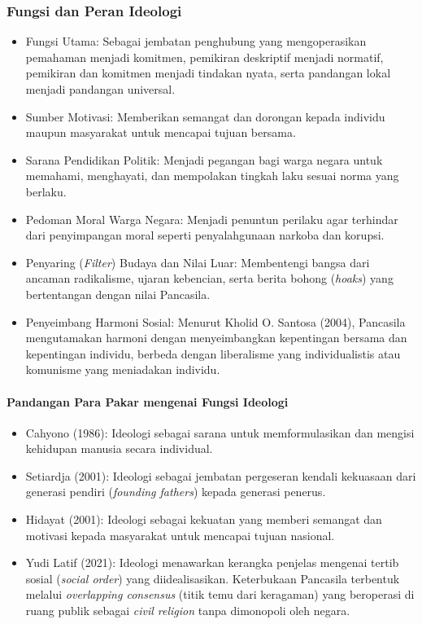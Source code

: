 \subsubsection{Fungsi dan Peran Ideologi}

\begin{itemize}
\item Fungsi Utama: Sebagai jembatan penghubung yang mengoperasikan pemahaman menjadi komitmen, pemikiran deskriptif menjadi normatif, pemikiran dan komitmen menjadi tindakan nyata, serta pandangan lokal menjadi pandangan universal.
\item Sumber Motivasi: Memberikan semangat dan dorongan kepada individu maupun masyarakat untuk mencapai tujuan bersama.
\item Sarana Pendidikan Politik: Menjadi pegangan bagi warga negara untuk memahami, menghayati, dan mempolakan tingkah laku sesuai norma yang berlaku.
\item Pedoman Moral Warga Negara: Menjadi penuntun perilaku agar terhindar dari penyimpangan moral seperti penyalahgunaan narkoba dan korupsi.
\item Penyaring (\textit{Filter}) Budaya dan Nilai Luar: Membentengi bangsa dari ancaman radikalisme, ujaran kebencian, serta berita bohong (\textit{hoaks}) yang bertentangan dengan nilai Pancasila.
\item Penyeimbang Harmoni Sosial: Menurut Kholid O. Santosa (2004), Pancasila mengutamakan harmoni dengan menyeimbangkan kepentingan bersama dan kepentingan individu, berbeda dengan liberalisme yang individualistis atau komunisme yang meniadakan individu.
\end{itemize}

\paragraph{Pandangan Para Pakar mengenai Fungsi Ideologi}
\begin{itemize}
\item Cahyono (1986): Ideologi sebagai sarana untuk memformulasikan dan mengisi kehidupan manusia secara individual.
\item Setiardja (2001): Ideologi sebagai jembatan pergeseran kendali kekuasaan dari generasi pendiri (\textit{founding fathers}) kepada generasi penerus.
\item Hidayat (2001): Ideologi sebagai kekuatan yang memberi semangat dan motivasi kepada masyarakat untuk mencapai tujuan nasional.
\item Yudi Latif (2021): Ideologi menawarkan kerangka penjelas mengenai tertib sosial (\textit{social order}) yang diidealisasikan. Keterbukaan Pancasila terbentuk melalui \textit{overlapping consensus} (titik temu dari keragaman) yang beroperasi di ruang publik sebagai \textit{civil religion} tanpa dimonopoli oleh negara.
\end{itemize}


